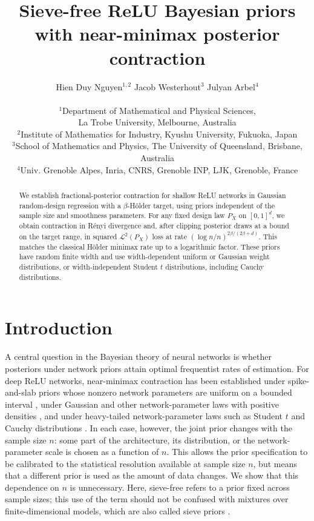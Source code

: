 \documentclass[11pt,a4paper]{article}
\title{Sieve-free ReLU Bayesian priors with near-minimax posterior contraction}
\author{Hien Duy Nguyen$^{1,2}$ \quad Jacob Westerhout$^{3}$ \quad Julyan Arbel$^{4}$\\[0.8em]
\parbox{0.96\textwidth}{\centering\small
$^{1}$Department of Mathematical and Physical Sciences,\\
La Trobe University, Melbourne, Australia\\
$^{2}$Institute of Mathematics for Industry, Kyushu University, Fukuoka, Japan\\
$^{3}$School of Mathematics and Physics, The University of Queensland, Brisbane, Australia\\
$^{4}$Univ. Grenoble Alpes, Inria, CNRS, Grenoble INP, LJK, Grenoble, France}}
\date{}
\theoremstyle{remark}
\begin{document}
\maketitle
\raggedbottom

\begin{abstract}
We establish fractional-posterior contraction for shallow ReLU networks
in Gaussian random-design regression with a $\beta$-H\"older target,
using priors independent of the sample size and smoothness parameters.
For any fixed design law $P_X$ on $[0,1]^d$, we obtain contraction in
R\'enyi divergence and, after clipping posterior draws at a bound on
the target range, in squared $\mathcal{L}^2(P_X)$ loss at rate
$(\log n/n)^{2\beta/(2\beta+d)}$.
This matches the classical H\"older minimax rate up to a logarithmic
factor.
These priors have random finite width and
use width-dependent uniform or Gaussian weight distributions, or
width-independent Student $t$ distributions, including Cauchy distributions.
\end{abstract}

\section{Introduction}

A central question in the Bayesian theory of neural networks is whether
posteriors under network priors attain optimal frequentist rates of
estimation. For deep ReLU networks, near-minimax contraction has been
established under spike-and-slab priors whose nonzero network parameters
are uniform on a bounded interval \citep{polsonrockova2018}, under
Gaussian and other network-parameter laws with positive densities
\citep{kongkim2025}, and under heavy-tailed network-parameter laws such as Student
$t$ and Cauchy distributions \citep{castilloegels2025}. In each case, however,
the joint prior changes with the sample size $n$: some part of the
architecture, its distribution, or the network-parameter scale is chosen as a
function of $n$. This allows the prior
specification to be calibrated to the statistical resolution available
at sample size $n$, but means that a different prior is used as the
amount of data changes. We show that this dependence on $n$ is
unnecessary. Here, sieve-free refers to a prior fixed across sample
sizes; this use of the term should not be confused with mixtures over
finite-dimensional models, which are also called sieve priors
\citep{arbel2013}.
\end{document}
